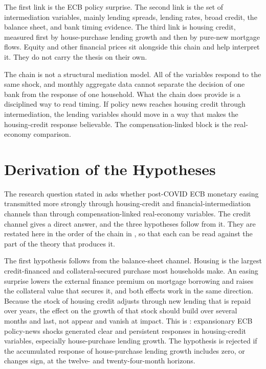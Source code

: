 The first link is the ECB policy surprise. The second link is the set of intermediation variables, mainly lending spreads, lending rates, broad credit, the balance sheet, and bank timing evidence. The third link is housing credit, measured first by house-purchase lending growth and then by pure-new mortgage flows. Equity and other financial prices sit alongside this chain and help interpret it. They do not carry the thesis on their own.

The chain is not a structural mediation model. All of the variables respond to the same shock, and monthly aggregate data cannot separate the decision of one bank from the response of one household. What the chain does provide is a disciplined way to read timing. If policy news reaches housing credit through intermediation, the lending variables should move in a way that makes the housing-credit response believable. The compensation-linked block is the real-economy comparison.

\section{Derivation of the Hypotheses}
\label{sec:hypothesis-derivation}

The research question stated in  asks whether post-COVID ECB monetary easing transmitted more strongly through housing-credit and financial-intermediation channels than through compensation-linked real-economy variables. The credit channel gives a direct answer, and the three hypotheses follow from it. They are restated here in the order of the chain in , so that each can be read against the part of the theory that produces it.

The first hypothesis follows from the balance-sheet channel. Housing is the largest credit-financed and collateral-secured purchase most households make. An easing surprise lowers the external finance premium on mortgage borrowing and raises the collateral value that secures it, and both effects work in the same direction. Because the stock of housing credit adjusts through new lending that is repaid over years, the effect on the growth of that stock should build over several months and last, not appear and vanish at impact. This is : expansionary ECB policy-news shocks generated clear and persistent responses in housing-credit variables, especially house-purchase lending growth. The hypothesis is rejected if the accumulated response of house-purchase lending growth includes zero, or changes sign, at the twelve- and twenty-four-month horizons.

